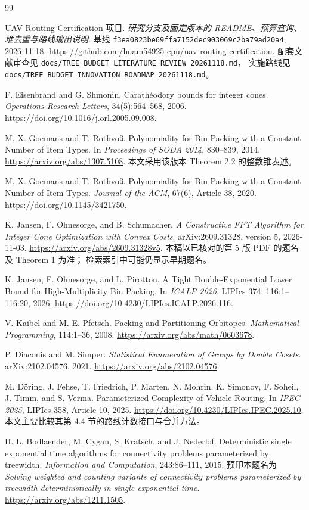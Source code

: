 \documentclass[UTF8,a4paper,11pt,fontset=fandol]{ctexart}
\theoremstyle{definition}
\newcommand{\repo}[1]{\nolinkurl{#1}}
\begin{document}
\begin{thebibliography}{99}

UAV Routing Certification 项目.
\emph{研究分支及固定版本的 README、预算查询、堆去重与路线输出说明}.
基线 \repo{f3ea0823be69ffa7152dec903069c2ba79ad20a4}, 2026-11-18.
\url{https://github.com/huam54925-cpu/uav-routing-certification}.
配套文献审查见
\repo{docs/TREE_BUDGET_LITERATURE_REVIEW_20261118.md}，
实施路线见
\repo{docs/TREE_BUDGET_INNOVATION_ROADMAP_20261118.md}。

F. Eisenbrand and G. Shmonin.
Carath\'eodory bounds for integer cones.
\emph{Operations Research Letters}, 34(5):564--568, 2006.
\url{https://doi.org/10.1016/j.orl.2005.09.008}.

M. X. Goemans and T. Rothvo\ss.
Polynomiality for Bin Packing with a Constant Number of Item Types.
In \emph{Proceedings of SODA 2014}, 830--839, 2014.
\url{https://arxiv.org/abs/1307.5108}.
本文采用该版本 Theorem 2.2 的整数锥表述。

M. X. Goemans and T. Rothvo\ss.
Polynomiality for Bin Packing with a Constant Number of Item Types.
\emph{Journal of the ACM}, 67(6), Article 38, 2020.
\url{https://doi.org/10.1145/3421750}.

K. Jansen, F. Ohnesorge, and B. Schumacher.
\emph{A Constructive FPT Algorithm for Integer Cone Optimization with Convex Costs}.
arXiv:2609.31328, version 5, 2026-11-03.
\url{https://arxiv.org/abs/2609.31328v5}.
本稿以已核对的第 5 版 PDF 的题名及 Theorem 1 为准；
检索索引中可能仍显示早期题名。

K. Jansen, F. Ohnesorge, and L. Pirotton.
A Tight Double-Exponential Lower Bound for High-Multiplicity Bin Packing.
In \emph{ICALP 2026}, LIPIcs 374, 116:1--116:20, 2026.
\url{https://doi.org/10.4230/LIPIcs.ICALP.2026.116}.

V. Kaibel and M. E. Pfetsch.
Packing and Partitioning Orbitopes.
\emph{Mathematical Programming}, 114:1--36, 2008.
\url{https://arxiv.org/abs/math/0603678}.

P. Diaconis and M. Simper.
\emph{Statistical Enumeration of Groups by Double Cosets}.
arXiv:2102.04576, 2021.
\url{https://arxiv.org/abs/2102.04576}.

M. D\"oring, J. Fehse, T. Friedrich, P. Marten, N. Mohrin,
K. Simonov, F. Soheil, J. Timm, and S. Verma.
Parameterized Complexity of Vehicle Routing.
In \emph{IPEC 2025}, LIPIcs 358, Article 10, 2025.
\url{https://doi.org/10.4230/LIPIcs.IPEC.2025.10}.
本文主要比较其第 4.4 节的路线计数接口与合并方法。

H. L. Bodlaender, M. Cygan, S. Kratsch, and J. Nederlof.
Deterministic single exponential time algorithms for connectivity problems
parameterized by treewidth.
\emph{Information and Computation}, 243:86--111, 2015.
预印本题名为
\emph{Solving weighted and counting variants of connectivity problems
parameterized by treewidth deterministically in single exponential time}.
\url{https://arxiv.org/abs/1211.1505}.

\end{thebibliography}
\end{document}
